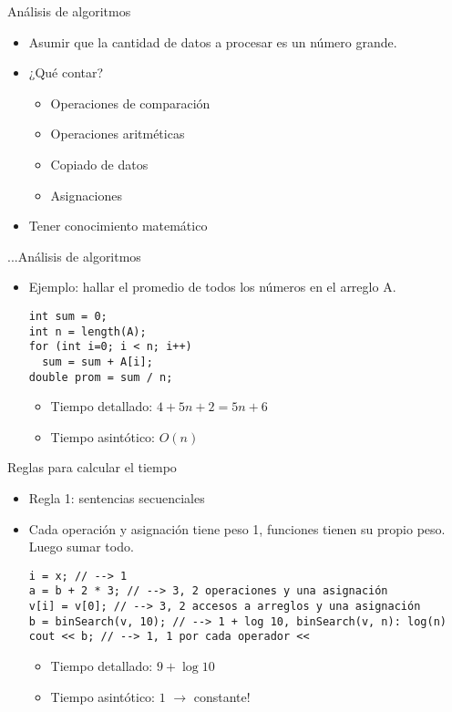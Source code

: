 \documentclass[aspectratio=169]{beamer}
\begin{document}
\begin{frame}{Análisis de algoritmos}
  \begin{itemize}
    \item Asumir que la cantidad de datos a procesar es un número grande.
    \item ¿Qué contar?
    \begin{itemize}
      \item Operaciones de comparación
      \item Operaciones aritméticas
      \item Copiado de datos
      \item Asignaciones
    \end{itemize}
    \item Tener conocimiento matemático
  \end{itemize}
\end{frame}

\begin{frame}[fragile]{...Análisis de algoritmos}
  \begin{itemize}
    \item Ejemplo: hallar el promedio de todos los números en el arreglo A.
	\begin{lstlisting}
int sum = 0;
int n = length(A);
for (int i=0; i < n; i++)
  sum = sum + A[i];
double prom = sum / n;
    \end{lstlisting}
    \begin{itemize}
      \item Tiempo detallado: $4 + 5n + 2 = 5n + 6$
      \item Tiempo asintótico: $O(n)$
    \end{itemize}
  \end{itemize}
\end{frame}

\begin{frame}[fragile]{Reglas para calcular el tiempo}
  \begin{itemize}
    \item Regla 1: sentencias secuenciales
    \item Cada operación y asignación tiene peso 1, funciones tienen su propio peso. Luego sumar todo.
    \begin{lstlisting}
i = x; // --> 1
a = b + 2 * 3; // --> 3, 2 operaciones y una asignación
v[i] = v[0]; // --> 3, 2 accesos a arreglos y una asignación
b = binSearch(v, 10); // --> 1 + log 10, binSearch(v, n): log(n)
cout << b; // --> 1, 1 por cada operador <<
    \end{lstlisting}
    \begin{itemize}
      \item Tiempo detallado: $9 + \log 10$
      \item Tiempo asintótico: $1$ $\longrightarrow$ constante!
    \end{itemize}
  \end{itemize}
\end{frame}
\end{document}
